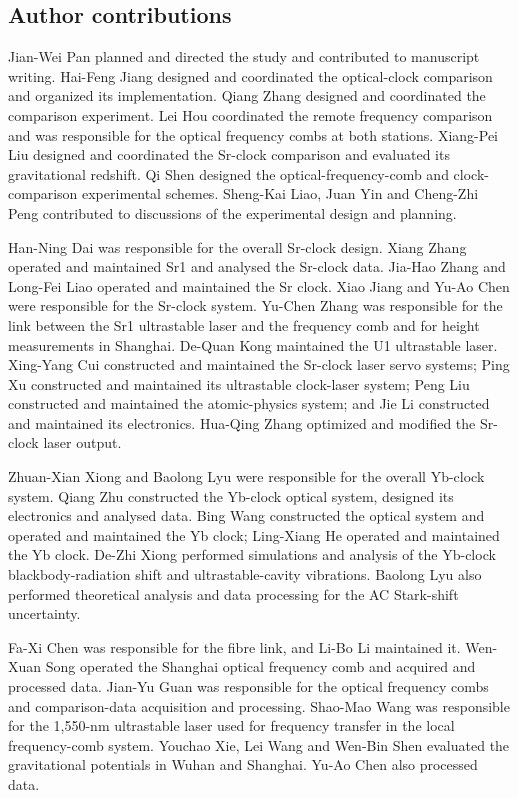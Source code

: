 \documentclass[
  11pt,
  a4paper,
]{article}
\begin{document}
\hypertarget{author-contributions}{%
\subsection{Author contributions}\label{author-contributions}}

Jian-Wei Pan planned and directed the study and contributed to
manuscript writing. Hai-Feng Jiang designed and coordinated the
optical-clock comparison and organized its implementation. Qiang Zhang
designed and coordinated the comparison experiment. Lei Hou coordinated
the remote frequency comparison and was responsible for the optical
frequency combs at both stations. Xiang-Pei Liu designed and coordinated
the Sr-clock comparison and evaluated its gravitational redshift. Qi
Shen designed the optical-frequency-comb and clock-comparison
experimental schemes. Sheng-Kai Liao, Juan Yin and Cheng-Zhi Peng
contributed to discussions of the experimental design and planning.

Han-Ning Dai was responsible for the overall Sr-clock design. Xiang
Zhang operated and maintained Sr1 and analysed the Sr-clock data.
Jia-Hao Zhang and Long-Fei Liao operated and maintained the Sr clock.
Xiao Jiang and Yu-Ao Chen were responsible for the Sr-clock system.
Yu-Chen Zhang was responsible for the link between the Sr1 ultrastable
laser and the frequency comb and for height measurements in Shanghai.
De-Quan Kong maintained the U1 ultrastable laser. Xing-Yang Cui
constructed and maintained the Sr-clock laser servo systems; Ping Xu
constructed and maintained its ultrastable clock-laser system; Peng Liu
constructed and maintained the atomic-physics system; and Jie Li
constructed and maintained its electronics. Hua-Qing Zhang optimized and
modified the Sr-clock laser output.

Zhuan-Xian Xiong and Baolong Lyu were responsible for the overall
Yb-clock system. Qiang Zhu constructed the Yb-clock optical system,
designed its electronics and analysed data. Bing Wang constructed the
optical system and operated and maintained the Yb clock; Ling-Xiang He
operated and maintained the Yb clock. De-Zhi Xiong performed simulations
and analysis of the Yb-clock blackbody-radiation shift and
ultrastable-cavity vibrations. Baolong Lyu also performed theoretical
analysis and data processing for the AC Stark-shift uncertainty.

Fa-Xi Chen was responsible for the fibre link, and Li-Bo Li maintained
it. Wen-Xuan Song operated the Shanghai optical frequency comb and
acquired and processed data. Jian-Yu Guan was responsible for the
optical frequency combs and comparison-data acquisition and processing.
Shao-Mao Wang was responsible for the 1,550-nm ultrastable laser used
for frequency transfer in the local frequency-comb system. Youchao Xie,
Lei Wang and Wen-Bin Shen evaluated the gravitational potentials in
Wuhan and Shanghai. Yu-Ao Chen also processed data.
\end{document}
